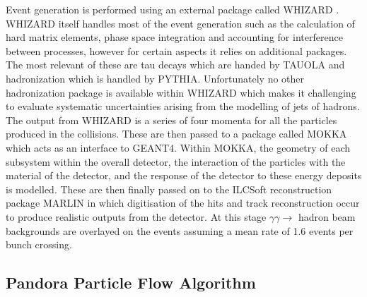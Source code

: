 Event generation is performed using an external package called WHIZARD \cite{Kilian:2007gr}. WHIZARD itself handles most of the event generation such as the calculation of hard matrix elements, phase space integration and accounting for interference between processes, however for certain aspects it relies on additional packages. The most relevant of these are tau decays which are handed by TAUOLA\cite{Jadach:1990mz} and hadronization which is handled by PYTHIA\cite{Sjostrand:2006za}. Unfortunately no other hadronization package is available within WHIZARD which makes it challenging to evaluate systematic uncertainties arising from the modelling of jets of hadrons. The output from WHIZARD is a series of four momenta for all the particles produced in the collisions. These are then passed to a package called MOKKA which acts as an interface to GEANT4\cite{MoradeFreitas:2002kj}. Within MOKKA, the geometry of each subsystem within the overall detector, the interaction of the particles with the material of the detector, and the response of the detector to these energy deposits is modelled. These are then finally passed on to the ILCSoft reconstruction package MARLIN in which digitisation of the hits and track reconstruction occur to produce realistic outputs from the detector. At this stage $\gamma\gamma\rightarrow$ hadron beam backgrounds are overlayed on the events assuming a mean rate of 1.6 events per bunch crossing.


\subsection{Pandora Particle Flow Algorithm}
\label{Pandora}

